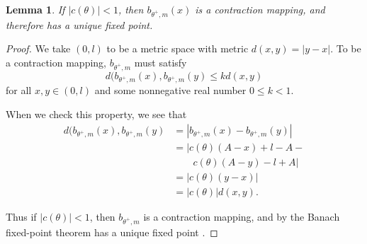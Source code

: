 \documentclass[letterpaper, 10 pt, conference]{ieeeconf}  %
\newtheorem{lemma}{\bf Lemma}
\begin{document}
\begin{lemma} \label{Lemma:4}
If $|c(\theta)| < 1$, then $b_{\theta^+,m}(x)$ is a contraction
mapping, and therefore has a unique fixed point.
\end{lemma}
\begin{proof}
We take $(0,l)$ to be a metric space with metric $d(x,y) =
|y-x|$. To be a contraction mapping, $b_{\theta^+,m}$ must satisfy
\begin{equation*}
d(b_{\theta^+,m}(x), b_{\theta^+,m}(y) \leq k d(x,y) 
\end{equation*}
\noindent for all $x, y \in (0,l)$ and some nonnegative real number $0 \leq k < 1$.

When we check this property, we see that
\begin{align*}
d(b_{\theta^+,m}(x), b_{\theta^+,m}(y) & = | b_{\theta^+,m}(x) - b_{\theta^+,m}(y)|\\
								 & = | c(\theta)(A-x)+l-A - \\
								 & \qquad c(\theta)(A-y)-l+A| \\
                               & = | c(\theta) (y-x) | \\
                               & = | c(\theta) | d(x,y).
\end{align*}

Thus if $|c(\theta)| <1$, then $b_{\theta^+,m}$ is a contraction mapping, and by the Banach fixed-point
theorem has a unique fixed point \cite{Granas2003}.
\end{proof}
\end{document}
